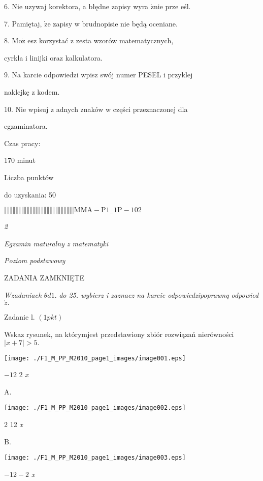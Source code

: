 \documentclass[a4paper,12pt]{article}
\begin{document}
6. Nie uzywaj korektora, a błędne zapisy wyra $\acute{\mathrm{z}}\mathrm{n}\mathrm{i}\mathrm{e}$ prze eśl.

7. Pamiętaj, $\dot{\mathrm{z}}\mathrm{e}$ zapisy w brudnopisie nie będą oceniane.

8. $\mathrm{M}\mathrm{o}\dot{\mathrm{z}}$ esz korzystać z zesta wzorów matematycznych,

cyrkla i linijki oraz kalkulatora.

9. Na karcie odpowiedzi wpisz swój numer PESEL i przyklej

naklejkę z kodem.

10. Nie wpisuj $\dot{\mathrm{z}}$ adnych znaków w części przeznaczonej dla

egzaminatora.

Czas pracy:

170 minut

Liczba punktów

do uzyskania: 50

$\Vert\Vert\Vert\Vert\Vert\Vert\Vert\Vert\Vert\Vert\Vert\Vert\Vert\Vert\Vert\Vert\Vert\Vert\Vert\Vert\Vert\Vert\Vert\Vert|  \mathrm{M}\mathrm{M}\mathrm{A}-\mathrm{P}1_{-}1\mathrm{P}-102$




{\it 2}

{\it Egzamin maturalny z matematyki}

{\it Poziom podstawowy}

ZADANIA ZAMKNIĘTE

{\it Wzadaniach} $\theta d1.$ {\it do 25. wybierz i zaznacz na karcie odpowiedzipoprawnq odpowied} $\acute{z}.$

Zadanie l. $(1pkt)$

Wskaz rysunek, na którymjest przedstawiony zbiór rozwiązań nierówności $|x+7|>5.$
\begin{center}
\texttt{[image: ./F1\_M\_PP\_M2010\_page1\_images/image001.eps]}
\end{center}
$-12$  2  {\it x}

A.
\begin{center}
\texttt{[image: ./F1\_M\_PP\_M2010\_page1\_images/image002.eps]}
\end{center}
2  12  {\it x}

B.
\begin{center}
\texttt{[image: ./F1\_M\_PP\_M2010\_page1\_images/image003.eps]}
\end{center}
$-12  -2$  {\it x}
\end{document}
